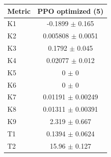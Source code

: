 \begin{tabular}{lc}
\toprule
Metric & PPO optimized (5) \\
\midrule
K1 & -0.1899 $\pm$ 0.165 \\
K2 & 0.005808 $\pm$ 0.0051 \\
K3 & 0.1792 $\pm$ 0.045 \\
K4 & 0.02077 $\pm$ 0.012 \\
K5 & 0 $\pm$ 0 \\
K6 & 0 $\pm$ 0 \\
K7 & 0.01191 $\pm$ 0.00249 \\
K8 & 0.01311 $\pm$ 0.00391 \\
K9 & 2.319 $\pm$ 0.667 \\
T1 & 0.1394 $\pm$ 0.0624 \\
T2 & 15.96 $\pm$ 0.127 \\
\bottomrule
\end{tabular}
